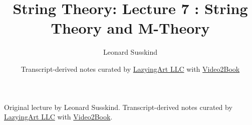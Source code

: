 \documentclass[11pt,oneside]{book}
\begin{document}
\frontmatter
\title{String Theory: Lecture 7 : String Theory and M-Theory}
\author{Leonard Susskind}
\date{Transcript-derived notes curated by \href{https://lazying.art}{LazyingArt LLC} with \href{https://github.com/lachlanchen/Video2Book}{Video2Book}}
\maketitle
\begin{center}
\small Original lecture by Leonard Susskind. Transcript-derived notes curated by \href{https://lazying.art}{LazyingArt LLC} with \href{https://github.com/lachlanchen/Video2Book}{Video2Book}.
\end{center}
\clearpage
\mainmatter

\end{document}
